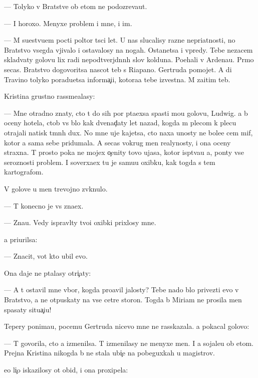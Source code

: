 \documentclass[10pt]{book}
\begin{document}
— Tolyko v Bratstve ob etom ne podozreva{\y}ut.

— I horoxo. Menyxe problem i mne, i im.

— M{\yi} su{\x}estvu{\y}em pocti poltor{\yi} t{\yi}s{\ia}ci let. U nas slucalisy razn{\yi}{\y}e nepri\-{\y}at\-nosti, no Bratstvo vsegda v{\yi}jivalo i ostavalosy na nogah. Ostanetsa i vpredy. Tebe nezacem sklad{\yi}vaty golovu lix radi nepodtverjd{\e}nn{\yi}h slov kolduna. Po{\y}ehali v Ardenau. Pr{\ia}mo se{\y}cas. Bratstvo dogovoritsa nascot teb{\ia} s Riapano. Gertruda pomojet. A di Travino tolyko poradu{\y}etsa informa{\c}i{\y}i, kotora{\y}a tebe izvestna. M{\yi} za{\x}itim teb{\ia}.

Kristina grustno rassme{\y}alasy:

— Mne otradno znaty, cto t{\yi} do sih por p{\yi}ta{\y}exsa spasti mo{\y}u golovu, Ludwig. {\Y}a b{\yi} oceny hotela, ctob{\yi} vs{\e} b{\yi}lo kak dvenad{\c}aty let nazad, kogda m{\yi} plecom k plecu otrajali natisk t{\e}mn{\yi}h dux. No mne uje kajetsa, cto naxa {\y}unosty ne bole{\y}e cem mif, kotor{\yi}{\y} {\y}a sama sebe pridumala. A se{\y}cas vokrug men{\ia} realynosty, i ona oceny straxna. T{\yi} prosto poka ne mojex o{\c}enity tovo ujasa, kotor{\yi}{\y} isp{\yi}t{\yi}va{\y}u {\y}a, pon{\ia}ty vse{\y} ser{\y}oznosti problem{\yi}. I soverxa{\y}ex tu je samu{\y}u oxibku, kak togda s tem kartografom.

V golove u men{\ia} trevojno zv{\ia}knulo.

— T{\yi} konecno je vs{\e} zna\-{\y}ex.

— Zna{\y}u. Vedy ispravl{\ia}ty tvo{\y}i oxibki pri\-xlosy mne.

{\Y}a pri{\x}urilsa:

— Znacit, vot kto ubil {\y}evo.

Ona daje ne p{\yi}talasy otri{\c}aty:

— A t{\yi} ostavil mne v{\yi}bor, kogda pro{\y}avil jalosty? Tebe nado b{\yi}lo privezti {\y}evo v Bratstvo, a ne otpuskaty na vse cet{\yi}re storon{\yi}. Togda b{\yi} Mi\-ri\-am ne prosila men{\ia} spasaty situa{\c}i{\y}u!

Tepery ponima{\y}u, pocemu Gertruda nicevo mne ne rasskazala. {\Y}a pokacal go\-lo\-vo{\y}:

— T{\yi} govorila, cto {\y}a izmenilsa. T{\yi} izmenilasy ne menyxe men{\ia}. I {\y}a sojale{\y}u ob etom. Prejn{\ia}{\y}a Kristina nikogda b{\yi} ne stala ubi{\y}{\c}e{\y} na pobeguxkah u magistrov.

{\Y}e{\y}o li{\c}o iskazilosy ot obid{\yi}, i ona proxipela:
\end{document}
